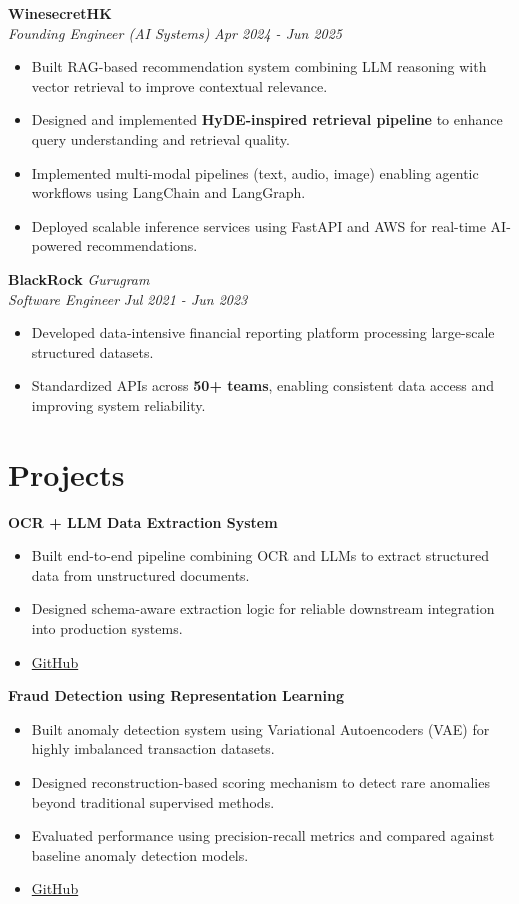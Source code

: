 \documentclass[10pt,a4paper]{article}
\newcommand{\resumeItem}[1]{\item\small{#1}}
\begin{document}
\vspace{4pt}

\textbf{WinesecretHK} \hfill \textit{} \\
\textit{Founding Engineer (AI Systems)} \hfill \textit{Apr 2024 - Jun 2025}
\begin{itemize}[leftmargin=*,noitemsep]
    \resumeItem{Built RAG-based recommendation system combining LLM reasoning with vector retrieval to improve contextual relevance.}
    \resumeItem{Designed and implemented \textbf{HyDE-inspired retrieval pipeline} to enhance query understanding and retrieval quality.}
    \resumeItem{Implemented multi-modal pipelines (text, audio, image) enabling agentic workflows using LangChain and LangGraph.}
    \resumeItem{Deployed scalable inference services using FastAPI and AWS for real-time AI-powered recommendations.}
\end{itemize}

\vspace{4pt}

\textbf{BlackRock} \hfill \textit{Gurugram} \\
\textit{Software Engineer} \hfill \textit{Jul 2021 - Jun 2023}
\begin{itemize}[leftmargin=*,noitemsep]
    \resumeItem{Developed data-intensive financial reporting platform processing large-scale structured datasets.}
    \resumeItem{Standardized APIs across \textbf{50+ teams}, enabling consistent data access and improving system reliability.}
\end{itemize}

\vspace{4pt}

\section{Projects}

\textbf{OCR + LLM Data Extraction System}
\begin{itemize}[leftmargin=*,noitemsep]
    \resumeItem{Built end-to-end pipeline combining OCR and LLMs to extract structured data from unstructured documents.}
    \resumeItem{Designed schema-aware extraction logic for reliable downstream integration into production systems.}
    \resumeItem{\href{https://github.com/kaulmesanyam/ocr-extractor}{GitHub}}
\end{itemize}

\vspace{4pt}

\textbf{Fraud Detection using Representation Learning}
\begin{itemize}[leftmargin=*,noitemsep]
    \resumeItem{Built anomaly detection system using Variational Autoencoders (VAE) for highly imbalanced transaction datasets.}
    \resumeItem{Designed reconstruction-based scoring mechanism to detect rare anomalies beyond traditional supervised methods.}
    \resumeItem{Evaluated performance using precision-recall metrics and compared against baseline anomaly detection models.}
    \resumeItem{\href{https://github.com/kaulmesanyam/IITH_MTech/blob/main/Sem_2/Fraud_Analytics/Fraud_Detection_Using_an_Autoencoder_and_Variational_Autoencoder.zip}{GitHub}}
\end{itemize}
\end{document}
